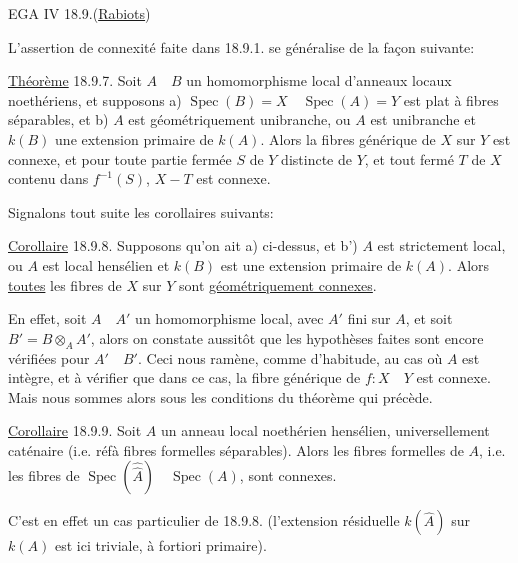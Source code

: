 EGA IV 18.9.\qquad (\uline{Rabiots})

L'assertion de connexité faite dans 18.9.1. se généralise de la façon suivante:

\uline{Théorème} 18.9.7. Soit $A\quad B$ un homomorphisme local d'anneaux locaux noethériens, et supposons a)  $\operatorname{Spec}(B)=X\quad\operatorname{Spec}(A)=Y$ est plat à fibres séparables, et b) $A$ est géométriquement unibranche, ou $A$ est unibranche et $k(B)$ une extension primaire de $k(A)$. Alors la fibres générique de $X$ sur $Y$ est connexe, et pour toute partie fermée $S$ de $Y$ distincte de $Y$,  et tout fermé $T$ de $X$ contenu dans $f^{-1}(S)$, $X-T$ est connexe.

Signalons tout  suite les corollaires suivants:

\uline{Corollaire} 18.9.8. Supposons qu'on ait a) ci-dessus, et b') $A$ est strictement local, ou $A$ est local hensélien et $k(B)$ est une extension primaire de $k(A)$. Alors \uline{toutes} les fibres de $X$ sur $Y$ sont \uline{géométriquement connexes}.

En effet, soit $A\quad A'$ un homomorphisme local, avec $A'$ fini sur $A$, et soit $B'=B\otimes_A A'$, alors on constate aussitôt que les hypothèses faites sont encore vérifiées pour $A'\quad B'$. Ceci nous ramène, comme d'habitude, au cas où $A$ est intègre, et à vérifier que dans ce cas, la fibre générique de $f:X\quad Y$ est connexe. Mais nous sommes alors sous les conditions du théorème qui précède.

\uline{Corollaire} 18.9.9. Soit $A$ un anneau local noethérien hensélien,  universellement caténaire (i.e. réf\quad à fibres formelles séparables). Alors les fibres formelles de $A$, i.e. les fibres de $\operatorname{Spec}(\hat{\hat A})\quad\operatorname{Spec}(A)$, sont  connexes.

C'est en effet un cas particulier de 18.9.8. (l'extension résiduelle $k(\hat A)$ sur $k(A)$ est ici triviale, à fortiori primaire).
